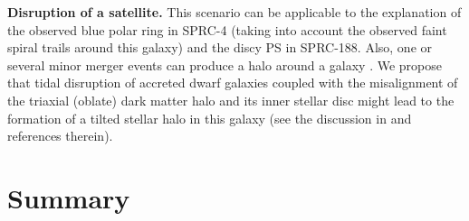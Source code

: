 \documentclass{raa}
\begin{document}
{\bf Disruption of a satellite.}
This scenario can be applicable to the explanation of the observed blue polar ring in SPRC-4 (taking into account the observed faint spiral trails around this galaxy) and the discy PS in SPRC-188. Also, one or several minor merger events can produce a halo around a galaxy \citep[see e.g.][]{2010MNRAS.406..744C}. We propose that tidal disruption of accreted dwarf galaxies coupled with the misalignment of the triaxial (oblate) dark matter halo \citep{2002ApJ...576...21V,2003ApJ...597...35C,2005ApJ...628...21S,2012ApJ...750..107S} and its inner stellar disc might lead to the formation of a tilted stellar halo in this galaxy (see the discussion in \citealt{2020MNRAS.497.2039M} and references therein).




\section{Summary}
\label{sec:summary}
\end{document}
